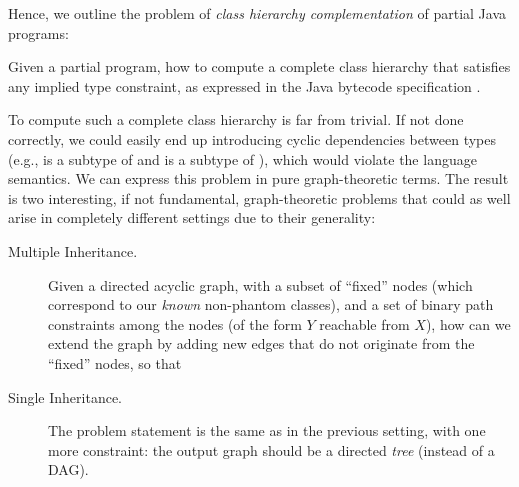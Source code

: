 Hence, we outline the problem of \emph{class hierarchy
  complementation} of partial Java programs:
\begin{displayquote}
  Given a partial program, how to compute a complete class hierarchy
  that satisfies any implied type constraint, as expressed in the Java
  bytecode specification \cite{Lindholm:1999:JVM:553607}.
\end{displayquote}

To compute such a complete class hierarchy is far from trivial.
If not done correctly, we could easily end up
introducing cyclic dependencies between types (e.g.,  is a
subtype of  and  is a subtype of ), which
would violate the language semantics. We can express this problem in
pure graph-theoretic terms. The result is two interesting, if not
fundamental, graph-theoretic problems that could as well arise in
completely different settings due to their generality:

\begin{description}
\item[Multiple Inheritance.] Given a directed acyclic graph, with a
  subset of ``fixed'' nodes (which correspond to our \emph{known}
  non-phantom classes), and a set of binary path constraints among the
  nodes (of the form \(Y\) reachable from \(X\)), how can we extend
  the graph by adding new edges that do not originate from the
  ``fixed'' nodes, so that
\item [Single Inheritance.] The problem statement is the same as in
  the previous setting, with one more constraint: the output graph
  should be a directed \emph{tree} (instead of a DAG).
\end{description}

